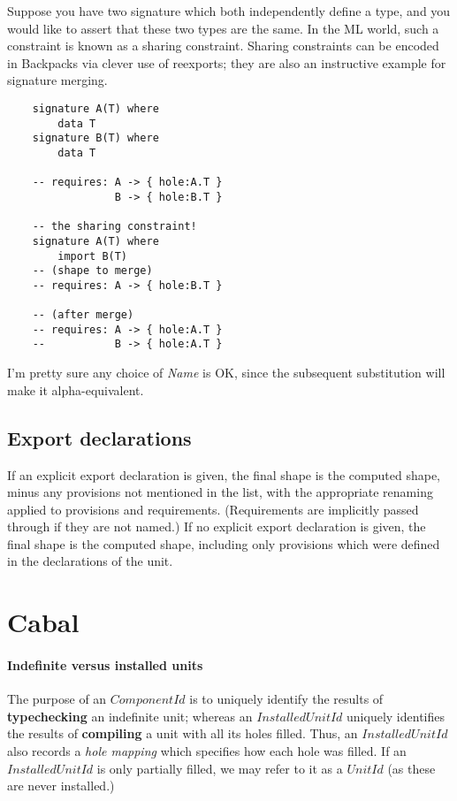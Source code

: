 \documentclass{article}
\newcommand{\I}[1]{\ensuremath{\mathit{#1}}}
\newcommand{\Red}[1]{{\color{red} #1}}
\begin{document}
Suppose you have two signature which both independently define a type,
and you would like to assert that these two types are the same.  In the
ML world, such a constraint is known as a sharing constraint.  Sharing
constraints can be encoded in Backpacks via clever use of reexports;
they are also an instructive example for signature merging.

\begin{verbatim}
    signature A(T) where
        data T
    signature B(T) where
        data T

    -- requires: A -> { hole:A.T }
                 B -> { hole:B.T }

    -- the sharing constraint!
    signature A(T) where
        import B(T)
    -- (shape to merge)
    -- requires: A -> { hole:B.T }

    -- (after merge)
    -- requires: A -> { hole:A.T }
    --           B -> { hole:A.T }
\end{verbatim}
%
\Red{I'm pretty sure any choice of \textit{Name} is OK, since the
subsequent substitution will make it alpha-equivalent.}

\subsection{Export declarations}

If an explicit export declaration is given, the final shape is the
computed shape, minus any provisions not mentioned in the list, with the
appropriate renaming applied to provisions and requirements.  (Requirements
are implicitly passed through if they are not named.)
If no explicit export declaration is given, the final shape is
the computed shape, including only provisions which were defined
in the declarations of the unit.


\section{Cabal}



\paragraph{Indefinite versus installed units}
The purpose of an \I{ComponentId} is to uniquely identify the results of \textbf{typechecking}
an indefinite unit; whereas an \I{InstalledUnitId} uniquely identifies
the results of \textbf{compiling} a unit with all its holes
filled.  Thus, an \I{InstalledUnitId} also records a \emph{hole mapping}
which specifies how each hole was filled.  If an \I{InstalledUnitId}
is only partially filled, we may refer to it as a \I{UnitId} (as these
are never installed.)
\end{document}
